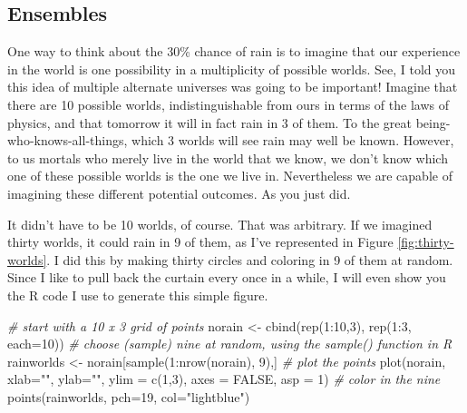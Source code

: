 \documentclass[
  openany]{book}
\newenvironment{Shaded}{\begin{snugshade}}{\end{snugshade}}
\newcommand{\AttributeTok}[1]{\textcolor[rgb]{0.77,0.63,0.00}{#1}}
\newcommand{\CommentTok}[1]{\textcolor[rgb]{0.56,0.35,0.01}{\textit{#1}}}
\newcommand{\ConstantTok}[1]{\textcolor[rgb]{0.00,0.00,0.00}{#1}}
\newcommand{\DecValTok}[1]{\textcolor[rgb]{0.00,0.00,0.81}{#1}}
\newcommand{\FunctionTok}[1]{\textcolor[rgb]{0.00,0.00,0.00}{#1}}
\newcommand{\NormalTok}[1]{#1}
\newcommand{\OtherTok}[1]{\textcolor[rgb]{0.56,0.35,0.01}{#1}}
\newcommand{\SpecialCharTok}[1]{\textcolor[rgb]{0.00,0.00,0.00}{#1}}
\newcommand{\StringTok}[1]{\textcolor[rgb]{0.31,0.60,0.02}{#1}}
\begin{document}
\hypertarget{ensembles}{%
\subsection*{Ensembles}\label{ensembles}}

One way to think about the 30\% chance of rain is to imagine that our experience in the world is one possibility in a multiplicity of possible worlds. See, I told you this idea of multiple alternate universes was going to be important! Imagine that there are 10 possible worlds, indistinguishable from ours in terms of the laws of physics, and that tomorrow it will in fact rain in 3 of them. To the great being-who-knows-all-things, which 3 worlds will see rain may well be known. However, to us mortals who merely live in the world that we know, we don't know which one of these possible worlds is the one we live in. Nevertheless we are capable of imagining these different potential outcomes. As you just did.

It didn't have to be 10 worlds, of course. That was arbitrary. If we imagined thirty worlds, it could rain in 9 of them, as I've represented in Figure \ref{fig:thirty-worlds}. I did this by making thirty circles and coloring in 9 of them at random. Since I like to pull back the curtain every once in a while, I will even show you the R code I use to generate this simple figure.

\begin{Shaded}
\begin{Highlighting}[]
\CommentTok{\# start with a 10 x 3 grid of points}
\NormalTok{norain }\OtherTok{\textless{}{-}} \FunctionTok{cbind}\NormalTok{(}\FunctionTok{rep}\NormalTok{(}\DecValTok{1}\SpecialCharTok{:}\DecValTok{10}\NormalTok{,}\DecValTok{3}\NormalTok{), }\FunctionTok{rep}\NormalTok{(}\DecValTok{1}\SpecialCharTok{:}\DecValTok{3}\NormalTok{, }\AttributeTok{each=}\DecValTok{10}\NormalTok{))  }
\CommentTok{\# choose (sample) nine at random, using the sample() function in R}
\NormalTok{rainworlds }\OtherTok{\textless{}{-}}\NormalTok{ norain[}\FunctionTok{sample}\NormalTok{(}\DecValTok{1}\SpecialCharTok{:}\FunctionTok{nrow}\NormalTok{(norain), }\DecValTok{9}\NormalTok{),]  }
\CommentTok{\# plot the points}
\FunctionTok{plot}\NormalTok{(norain, }\AttributeTok{xlab=}\StringTok{""}\NormalTok{, }\AttributeTok{ylab=}\StringTok{""}\NormalTok{, }\AttributeTok{ylim =} \FunctionTok{c}\NormalTok{(}\DecValTok{1}\NormalTok{,}\DecValTok{3}\NormalTok{), }\AttributeTok{axes =} \ConstantTok{FALSE}\NormalTok{, }\AttributeTok{asp =} \DecValTok{1}\NormalTok{) }
\CommentTok{\# color in the nine}
\FunctionTok{points}\NormalTok{(rainworlds, }\AttributeTok{pch=}\DecValTok{19}\NormalTok{, }\AttributeTok{col=}\StringTok{"lightblue"}\NormalTok{) }
\end{Highlighting}
\end{Shaded}
\end{document}
